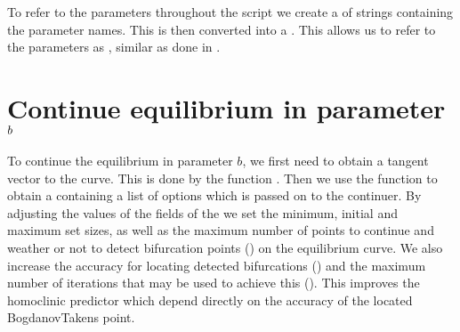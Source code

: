\documentclass[letterpaper,10pt,english]{jupyterBook}
\begin{document}
\sphinxAtStartPar
To refer to the parameters throughout the script we create a  of
strings containing the parameter names. This is then converted into a
. This allows us to refer to the parameters as ,
similar as done in .

\begin{sphinxVerbatim}[commandchars=\\\{\}]
\PYG{p}{[}\PYG{p}{]}
\PYG{p}{[}\PYG{p}{]}
\end{sphinxVerbatim}


\section{Continue equilibrium in parameter \protect\(b\protect\)}
\label{\detokenize{SIRmodel:continue-equilibrium-in-parameter-b}}
\sphinxAtStartPar
To continue the equilibrium in parameter \(b\), we first need to obtain a
tangent vector to the curve. This is done by the function . Then we
use the function  to obtain a  containing a list of options
which is passed on to the continuer. By adjusting the values of the fields of
the   we set the minimum, initial and maximum set sizes, as well
as the maximum number of points to continue and weather or not to detect
bifurcation points () on the equilibrium curve.  We also
increase the accuracy for locating detected bifurcations () and
the maximum number of iterations that may be used to achieve this
(). This improves the homoclinic predictor which depend directly
on the accuracy of the located Bogdanov\sphinxhyphen{}Takens point.
\end{document}
